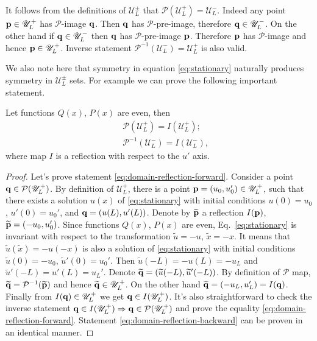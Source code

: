 It follows from the definitions of $\mathscr{U}_L^{\pm}$ that $\mathcal{P}(\mathscr{U}_L^+) = \mathscr{U}_L^-$.
Indeed any point $\vb{p} \in \mathscr{U}_L^+$ has $\mathcal{P}$-image $\vb{q}$.
Then $\vb{q}$ has $\mathcal{P}$-pre-image, therefore $\vb{q} \in \mathscr{U}_L^-$.
On the other hand if $\vb{q} \in \mathscr{U}_L^-$ then $\vb{q}$ has $\mathcal{P}$-pre-image $\vb{p}$.
Therefore $\vb{p}$ has $\mathcal{P}$-image and hence $\vb{p} \in \mathscr{U}_L^+$.
Inverse statement $\mathcal{P}^{-1}(\mathscr{U}_L^-) = \mathscr{U}_L^+$ is also valid.

We also note here that symmetry in equation \eqref{eq:stationary} naturally produces symmetry in $\mathscr{U}_L^{\pm}$ sets.
For example we can prove the following important statement.

\begin{proposition}
	Let functions $Q(x)$, $P(x)$ are even, then 
	\begin{eqnarray}
		&& \mathcal{P}(\mathscr{U}_L^+) = I (\mathscr{U}_L^+); \label{eq:domain-reflection-forward} \\
		&& \mathcal{P}^{-1}(\mathscr{U}_L^-) = I (\mathscr{U}_L^-), 	\label{eq:domain-reflection-backward}
	\end{eqnarray}
	where map $I$ is a reflection with respect to the $u'$ axis.
\label{prop:domain-reflection}
\end{proposition}
\begin{proof}
	Let's prove statement \eqref{eq:domain-reflection-forward}.
	Consider a point $\vb{q} \in \mathcal{P}(\mathscr{U}_L^+)$.
	By definition of $\mathscr{U}_L^+$, there is a point $\vb{p} = (u_0, u_0') \in \mathscr{U}_L^+$, such that there exists a solution $u(x)$ of \eqref{eq:stationary} with initial conditions $u(0) = u_0$, $u'(0) = u_0'$, and $\vb{q} = (u(L), u'(L))$.
	Denote by $\widetilde{\vb{p}}$ a reflection $I(\vb{p})$, $\widetilde{\vb{p}} = (-u_0, u_0')$.
	Since functions $Q(x)$, $P(x)$ are even, Eq.~\eqref{eq:stationary} is invariant with respect to the transformation $\widetilde{u} = -u$, $\widetilde{x} = -x$.
	It means that $\widetilde{u}(\widetilde{x}) = -u(-x)$ is also a solution of \eqref{eq:stationary} with initial conditions $\widetilde{u}(0) = -u_0$, $\widetilde{u}'(0) = u_0'$.
	Then $\widetilde{u}(-L) = -u(L) = -u_L$ and $\widetilde{u}'(-L) = u'(L) = u_L'$.
	Denote $\widetilde{\vb{q}} = (\widetilde{u}(-L), \widetilde{u}'(-L))$.
	By definition of $\mathcal{P}$ map, $\widetilde{\vb{q}} = \mathcal{P}^{-1}(\widetilde{\vb{p}})$ and hence $\widetilde{\vb{q}} \in \mathscr{U}_L^+$.
	On the other hand $\widetilde{\vb{q}} = (-u_L, u_L') = I(\vb{q})$.
	Finally from $I(\vb{q)} \in \mathscr{U}_L^+$ we get $\vb{q} \in I(\mathscr{U}_L^+)$.
	It's also straightforward to check the inverse statement $\vb{q} \in I(\mathscr{U}_L^+) \Rightarrow \vb{q} \in \mathcal{P}(\mathscr{U}_L^+)$ and prove the equality \eqref{eq:domain-reflection-forward}.
	Statement \eqref{eq:domain-reflection-backward} can be proven in an identical manner.
\end{proof}

